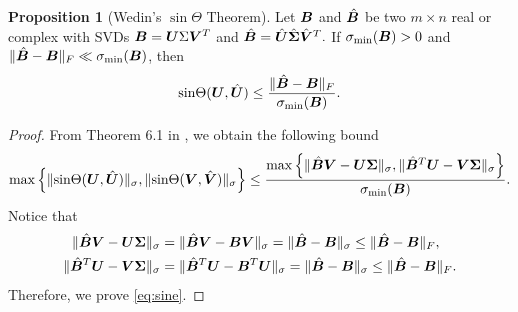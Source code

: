 \documentclass[12pt]{article}
\theoremstyle{definition}
\newtheorem{prop}{Proposition}
\theoremstyle{definition}
\begin{document}
\begin{prop}[Wedin's $\sin\Theta$ Theorem]\label{prop:sinebound}
Let $\bm B$ and $\hat{\bm B}$ be two $m\times n$ real or complex with SVDs $\bm B = \bm{U}\Sigma\bm{V}^T$ and $\hat{\bm B} = \hat{\bm{U}}\hat{\bm \Sigma}\hat{\bm{V}}^T.$ If $\sigma_{\text{min}}(\bm B)>0$ and $\lVert\hat{\bm B}-\bm B\rVert_F\ll \sigma_{\text{min}}(\bm B)$, then
\begin{align}\label{eq:sine}
    \text{sin} \Theta(\bm{U},\hat{\bm{U}}) \leq \frac{\lVert\hat{\bm B}-\bm B\rVert_F}{\sigma_{\text{min}}(\bm B)}.
\end{align}

\end{prop}
\begin{proof}
From Theorem 6.1 in \cite{wang2017tensor}, we  obtain the following bound 
\begin{align}
    \max\left\{\lVert\text{sin}\Theta(\bm{U},\hat{\bm{U}})\rVert_\sigma,\lVert\text{sin}\Theta(\bm{V},\hat{\bm{V}})\rVert_\sigma\right\}\leq \frac{\max\left\{\lVert\hat{\bm B}\bm{V}-\bm{U}\bm \Sigma\rVert_\sigma,\lVert\hat{\bm B}^T\bm{U}-\bm{V}\bm \Sigma\rVert_\sigma\right\}}{\sigma_{\text{min}}(\bm B)}.
\end{align}
Notice that
\begin{align}
    \lVert\hat{\bm B}\bm{V}-\bm{U}\bm \Sigma\rVert_\sigma &= \lVert\hat{\bm B}\bm{V}-\bm B\bm{V}\rVert_\sigma = \lVert\hat{\bm B}-\bm B\rVert_\sigma \leq \lVert\hat{\bm B}-\bm B\rVert_F,\\
    \lVert\hat{\bm B}^T\bm{U}-\bm{V}\bm \Sigma\rVert_\sigma &= \lVert\hat{\bm B}^T\bm{U}-\bm B^T\bm{U}\rVert_\sigma = \lVert\hat{\bm B}-\bm B\rVert_\sigma \leq \lVert\hat{\bm B}-\bm B\rVert_F.
\end{align}
Therefore, we prove \eqref{eq:sine}.
\end{proof}
\end{document}
